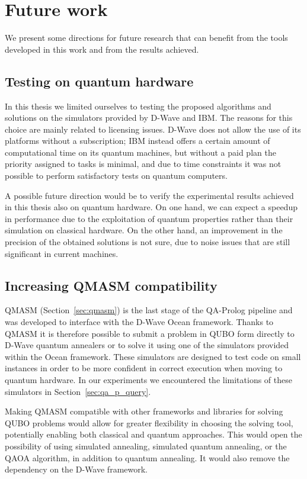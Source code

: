 \section{Future work}
We present some directions for future research that can benefit from the tools developed in this work and from the results achieved.
\subsection{Testing on quantum hardware}
In this thesis we limited ourselves to testing the proposed algorithms and solutions on the simulators provided by D-Wave and IBM. The reasons for this choice are mainly related to licensing issues. D-Wave does not allow the use of its platforms without a subscription; IBM instead offers a certain amount of computational time on its quantum machines, but without a paid plan the priority assigned to tasks is minimal, and due to time constraints it was not possible to perform satisfactory tests on quantum computers.

A possible future direction would be to verify the experimental results achieved in this thesis also on quantum hardware. On one hand, we can expect a speedup in performance due to the exploitation of quantum properties rather than their simulation on classical hardware. On the other hand, an improvement in the precision of the obtained solutions is not sure, due to noise issues that are still significant in current machines.

\subsection{Increasing QMASM compatibility}
QMASM (Section~\ref{sec:qmasm}) is the last stage of the QA-Prolog pipeline and was developed to interface with the D-Wave Ocean framework. Thanks to QMASM it is therefore possible to submit a problem in QUBO form directly to D-Wave quantum annealers or to solve it using one of the simulators provided within the Ocean framework. These simulators are designed to test code on small instances in order to be more confident in correct execution when moving to quantum hardware. In our experiments we encountered the limitations of these simulators in Section~\ref{sec:qa_p_query}.

Making QMASM compatible with other frameworks and libraries for solving QUBO problems would allow for greater flexibility in choosing the solving tool, potentially enabling both classical and quantum approaches. This would open the possibility of using simulated annealing, simulated quantum annealing, or the QAOA algorithm, in addition to quantum annealing. It would also remove the dependency on the D-Wave framework.


